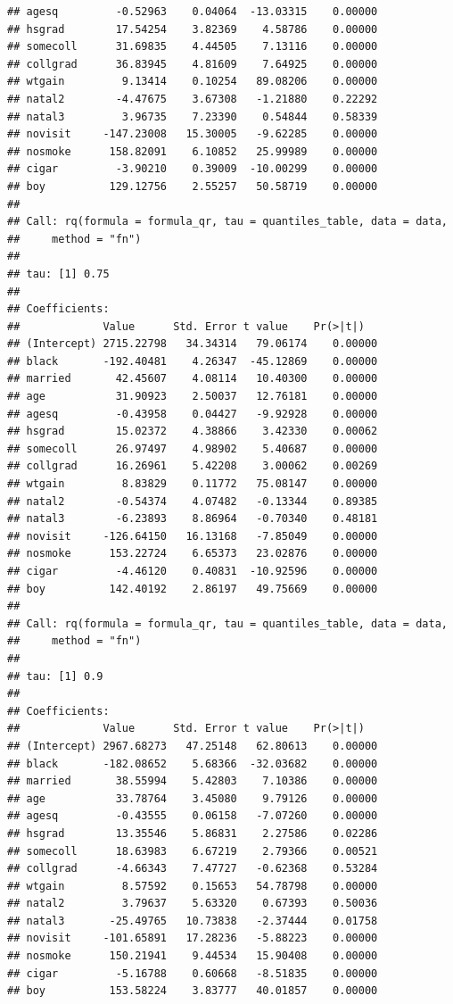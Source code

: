 \documentclass[]{book}
\begin{document}
\begin{verbatim}
## agesq         -0.52963    0.04064  -13.03315    0.00000
## hsgrad        17.54254    3.82369    4.58786    0.00000
## somecoll      31.69835    4.44505    7.13116    0.00000
## collgrad      36.83945    4.81609    7.64925    0.00000
## wtgain         9.13414    0.10254   89.08206    0.00000
## natal2        -4.47675    3.67308   -1.21880    0.22292
## natal3         3.96735    7.23390    0.54844    0.58339
## novisit     -147.23008   15.30005   -9.62285    0.00000
## nosmoke      158.82091    6.10852   25.99989    0.00000
## cigar         -3.90210    0.39009  -10.00299    0.00000
## boy          129.12756    2.55257   50.58719    0.00000
## 
## Call: rq(formula = formula_qr, tau = quantiles_table, data = data, 
##     method = "fn")
## 
## tau: [1] 0.75
## 
## Coefficients:
##             Value      Std. Error t value    Pr(>|t|)  
## (Intercept) 2715.22798   34.34314   79.06174    0.00000
## black       -192.40481    4.26347  -45.12869    0.00000
## married       42.45607    4.08114   10.40300    0.00000
## age           31.90923    2.50037   12.76181    0.00000
## agesq         -0.43958    0.04427   -9.92928    0.00000
## hsgrad        15.02372    4.38866    3.42330    0.00062
## somecoll      26.97497    4.98902    5.40687    0.00000
## collgrad      16.26961    5.42208    3.00062    0.00269
## wtgain         8.83829    0.11772   75.08147    0.00000
## natal2        -0.54374    4.07482   -0.13344    0.89385
## natal3        -6.23893    8.86964   -0.70340    0.48181
## novisit     -126.64150   16.13168   -7.85049    0.00000
## nosmoke      153.22724    6.65373   23.02876    0.00000
## cigar         -4.46120    0.40831  -10.92596    0.00000
## boy          142.40192    2.86197   49.75669    0.00000
## 
## Call: rq(formula = formula_qr, tau = quantiles_table, data = data, 
##     method = "fn")
## 
## tau: [1] 0.9
## 
## Coefficients:
##             Value      Std. Error t value    Pr(>|t|)  
## (Intercept) 2967.68273   47.25148   62.80613    0.00000
## black       -182.08652    5.68366  -32.03682    0.00000
## married       38.55994    5.42803    7.10386    0.00000
## age           33.78764    3.45080    9.79126    0.00000
## agesq         -0.43555    0.06158   -7.07260    0.00000
## hsgrad        13.35546    5.86831    2.27586    0.02286
## somecoll      18.63983    6.67219    2.79366    0.00521
## collgrad      -4.66343    7.47727   -0.62368    0.53284
## wtgain         8.57592    0.15653   54.78798    0.00000
## natal2         3.79637    5.63320    0.67393    0.50036
## natal3       -25.49765   10.73838   -2.37444    0.01758
## novisit     -101.65891   17.28236   -5.88223    0.00000
## nosmoke      150.21941    9.44534   15.90408    0.00000
## cigar         -5.16788    0.60668   -8.51835    0.00000
## boy          153.58224    3.83777   40.01857    0.00000
\end{verbatim}
\end{document}

